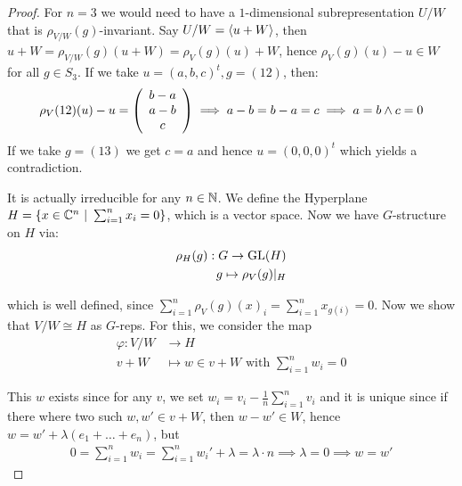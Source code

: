 \documentclass[twoside = false,	%
		headsepline,		%
		parskip = true,
		]{scrbook}						%
\begin{document}
    \begin{proof}
        For $n=3$ we would need to have a $1$-dimensional subrepresentation $U/W$ that is $\rho_{V/W}(g)$-invariant. Say $U/W = \left\langle u + W\right\rangle$, then $u + W = \rho_{V/W}(g)(u+W) = \rho_{V}(g)(u) + W$, hence $\rho_V(g)(u) - u \in W$ for all $g \in S_3$. If we take $u = (a,b,c)^t, g = (12)$, then:
        \begin{equation*}
            \rho_V(12)(u) - u = \left( \begin{array}{c}
                 b-a  \\
                 a-b \\
                 c
            \end{array}\right) \implies a-b = b-a = c \implies a = b \land c = 0
        \end{equation*}
        If we take $g = (13)$ we get $c = a$ and hence $u = (0,0,0)^t$ which yields a contradiction.
        
        It is actually irreducible for any $n \in \mathbb N$. We define the Hyperplane $H = \{x \in \mathbb C^n \ | \ \sum_{i=1}^n x_i = 0\}$, which is a vector space. Now we have $G$-structure on $H$ via:
        \begin{equation*}
        \begin{split}
            \rho_H(g): G \to \mathrm{GL}(H) \\
                        g \mapsto \rho_V(g)|_H
        \end{split}
        \end{equation*}
        
        which is well defined, since $\sum_{i=1}^n\rho_V(g)(x)_i = \sum_{i=1}^n x_{g(i)} = 0$. Now we show that $V/W \cong H$ as $G$-reps. For this, we consider the map
        \begin{equation*}
        \begin{split}
            \varphi: V/W &\to H \\
                    v + W &\mapsto w \in v + W \text{ with } \sum_{i=1}^n w_i = 0
        \end{split}
        \end{equation*}
        
        This $w$ exists since for any $v$, we set $w_i = v_i - \frac{1}{n}\sum_{i=1}^n v_i$ and it is unique since if there where two such $w,w' \in v +W$, then $w-w' \in W$, hence $w = w' + \lambda (e_1 + \dots + e_n)$, but
        \begin{equation*}
        \begin{split}
            0 = \sum_{i=1}^n w_i = \sum_{i=1}^n w_i' + \lambda = \lambda \cdot n \implies \lambda = 0 \implies w = w'
        \end{split}
        \end{equation*}
        

\end{proof}
\end{document}
